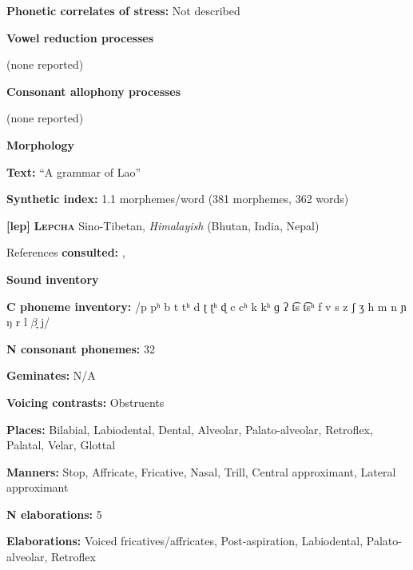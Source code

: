 \textbf{Phonetic correlates of stress:} Not described



\textbf{Vowel reduction processes}



(none reported)



\textbf{Consonant allophony processes}



(none reported)



\textbf{Morphology}



\textbf{Text:} “A grammar of Lao” \citep[488-497]{Enfield2007}



\textbf{Synthetic index:} 1.1 morphemes/word (381 morphemes, 362 words)



\textbf{[lep]}   \textbf{\textsc{Lepcha}}    Sino-Tibetan, \textit{Himalayish} (Bhutan, India, Nepal)



References \textbf{consulted:} \citet{Plaisier2007}, \citet{Sprigg1966}



\textbf{Sound inventory}



\textbf{C phoneme inventory:} /p pʰ b t tʰ d ʈ ʈʰ ɖ c cʰ k kʰ ɡ ʔ t͡s t͡sʰ f v s z ʃ ʒ h m n ɲ ŋ r l $\beta ̞$ j/



\textbf{N consonant phonemes:} 32



\textbf{Geminates:} N/A



\textbf{Voicing contrasts:} Obstruents



\textbf{Places:} Bilabial, Labiodental, Dental, Alveolar, Palato-alveolar, Retroflex, Palatal, Velar, Glottal



\textbf{Manners:} Stop, Affricate, Fricative, Nasal, Trill, Central approximant, Lateral approximant



\textbf{N elaborations:} 5



\textbf{Elaborations:} Voiced fricatives/affricates, Post-aspiration, Labiodental, Palato-alveolar, Retroflex



